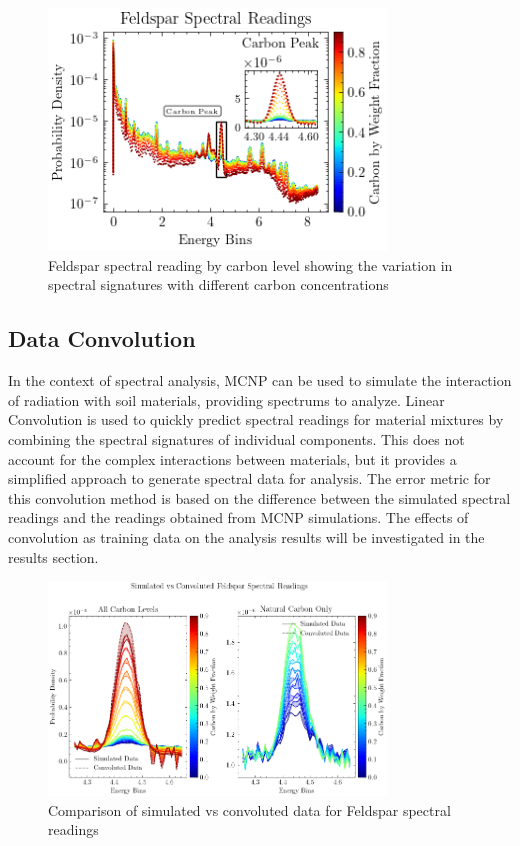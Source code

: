 \documentclass[review]{elsarticle}
\begin{document}
\begin{figure}[H]
\centering
\includegraphics[width=0.8\textwidth]{../Figures/DataGeneration/FeldsparSpectralReadingByCarbonLevel.png}
\caption{Feldspar spectral reading by carbon level showing the variation in spectral signatures with different carbon concentrations}
\label{fig:feldspar_carbon}
\end{figure}

\subsection{Data Convolution}

In the context of spectral analysis, MCNP can be used to simulate the interaction of radiation with soil materials, providing spectrums to analyze. Linear Convolution is used to quickly predict spectral readings for material mixtures by combining the spectral signatures of individual components. This does not account for the complex interactions between materials, but it provides a simplified approach to generate spectral data for analysis. The error metric for this convolution method is based on the difference between the simulated spectral readings and the readings obtained from MCNP simulations. The effects of convolution as training data on the analysis results will be investigated in the results section.

\begin{figure}[H]
\centering
\includegraphics[width=0.8\textwidth]{../Figures/DataGeneration/Sim_vs_Convoluted_FeldsparSpectralReadings_Combined.png}
\caption{Comparison of simulated vs convoluted data for Feldspar spectral readings}
\label{fig:sim_vs_conv}
\end{figure}
\end{document}

